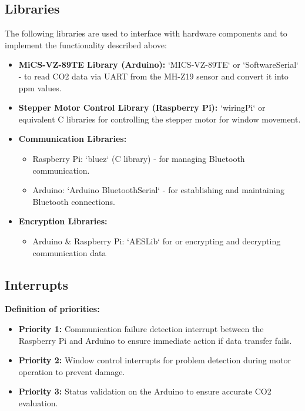 \subsection{Libraries}
The following libraries are used to interface with hardware components and to implement the functionality described above:
\begin{itemize}
    \item \textbf{MiCS-VZ-89TE Library (Arduino):} `MICS-VZ-89TE` or `SoftwareSerial` - to read CO2 data via UART from the MH-Z19 sensor and convert it into ppm values.
    \item \textbf{Stepper Motor Control Library (Raspberry Pi):} `wiringPi` or equivalent C libraries for controlling the stepper motor for window movement.
    \item \textbf{Communication Libraries:}
        \begin{itemize}
            \item Raspberry Pi: `bluez` (C library) - for managing Bluetooth communication.
            \item Arduino: `Arduino BluetoothSerial` - for establishing and maintaining Bluetooth connections.
        \end{itemize}
    \item \textbf{Encryption Libraries:}
        \begin{itemize}
            \item Arduino \& Raspberry Pi: `AESLib` for or encrypting and decrypting communication data
        \end{itemize}
\end{itemize}

\subsection{Interrupts}
\textbf{Definition of priorities:}
\begin{itemize}
    \item \textbf{Priority 1:} Communication failure detection interrupt between the Raspberry Pi and Arduino to ensure immediate action if data transfer fails.
    \item \textbf{Priority 2:} Window control interrupts for problem detection during motor operation to prevent damage.
    \item \textbf{Priority 3:} Status validation on the Arduino to ensure accurate CO2 evaluation.
\end{itemize}

